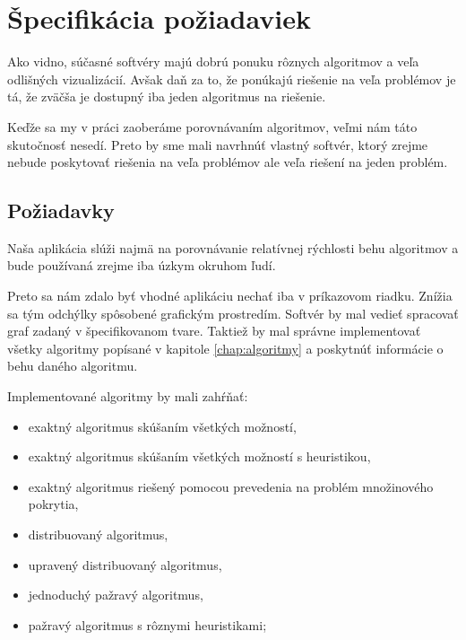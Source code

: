 \section{Špecifikácia požiadaviek}

Ako vidno, súčasné softvéry majú dobrú ponuku rôznych algoritmov a veľa 
odlišných vizualizácií. Avšak daň za to, že ponúkajú riešenie na veľa problémov 
je tá, že zväčša je dostupný iba jeden algoritmus na riešenie.

Keďže sa my v práci zaoberáme porovnávaním algoritmov, veľmi nám táto 
skutočnosť nesedí. Preto by sme mali navrhnúť vlastný softvér, ktorý zrejme 
nebude poskytovať riešenia na veľa problémov ale veľa riešení na jeden problém.


\subsection{Požiadavky}

Naša aplikácia slúži najmä na porovnávanie relatívnej rýchlosti behu algoritmov 
a bude používaná zrejme iba úzkym okruhom ľudí.

Preto sa nám zdalo byť vhodné aplikáciu nechať iba v príkazovom riadku. Znížia 
sa tým odchýlky spôsobené grafickým prostredím. Softvér by mal vedieť spracovať 
graf zadaný v špecifikovanom tvare. Taktiež by mal správne 
implementovať všetky algoritmy popísané v kapitole \ref{chap:algoritmy} a 
poskytnúť informácie o behu daného algoritmu.

Implementované algoritmy by mali zahŕňať:

\begin{itemize}
	\item exaktný algoritmus skúšaním všetkých možností,
	\item exaktný algoritmus skúšaním všetkých možností s heuristikou,
	\item exaktný algoritmus riešený pomocou prevedenia na problém množinového 
		pokrytia,
	\item distribuovaný algoritmus,
	\item upravený distribuovaný algoritmus,
	\item jednoduchý pažravý algoritmus,
	\item pažravý algoritmus s rôznymi heuristikami;
\end{itemize}


